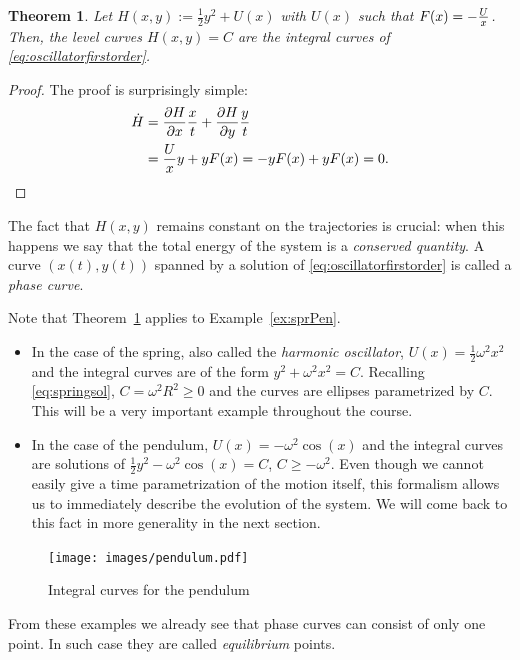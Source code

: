 \documentclass[english,fontsize=11pt,paper=a5,oneside]{scrbook}
\let\d\relax
\DeclareMathOperator{\d}{d}
\newtheorem{theorem}{Theorem}[chapter]
\theoremstyle{definition}
\newenvironment{example}
  {\pushQED{\qed}\renewcommand{\qedsymbol}{$\lozenge$}\examplex}
  {\popQED\endexamplex}
\begin{document}
\begin{theorem}\label{thm:ham1}
    Let $H(x, y) := \frac12 y^2 + U(x)$ with $U(x)$ such that $F(x) = -\frac{\d U}{\d x}$.
    Then, the level curves $H(x,y) = C$ are the integral curves of \eqref{eq:oscillatorfirstorder}.
\end{theorem}
\begin{proof}
The proof is surprisingly simple:
\begin{align*}
    \dot H &= \frac{\partial H}{\partial x}\frac{\d x}{\d t} + \frac{\partial H}{\partial y}\frac{\d y}{\d t} \\
    & = \frac{\d U}{\d x} y + y F(x)
    = -y F(x) + y F(x) = 0.
\end{align*}
\end{proof}

The fact that $H(x,y)$ remains constant on the trajectories is crucial: when this happens we say that the total energy of the system is a \emph{conserved quantity}.
A curve $(x(t), y(t))$ spanned by a solution of \eqref{eq:oscillatorfirstorder} is called a \emph{phase curve}.

\begin{example}
Note that Theorem~\ref{thm:ham1} applies to Example~\ref{ex:sprPen}.
\begin{itemize}
    \item In the case of the spring, also called the \emph{harmonic oscillator}, $U(x) = \frac12 \omega^2 x^2$ and the integral curves are of the form $y^2 + \omega^2 x^2 = C$.
    Recalling \eqref{eq:springsol}, $C = \omega^2 R^2 \geq 0$ and the curves are ellipses parametrized by $C$. 
    This will be a very important example throughout the course.
    \item In the case of the pendulum, $U(x) = -\omega^2 \cos(x)$ and the integral curves are solutions of $\frac12 y^2 - \omega^2 \cos(x) = C$, $C \geq -\omega^2$.
    Even though we cannot easily give a time parametrization of the motion itself, this formalism allows us to immediately describe the evolution of the system.
    We will come back to this fact in more generality in the next section.
\end{itemize}
\end{example}

\begin{figure}[ht]
    \centering
    \texttt{[image: images/pendulum.pdf]}
    \caption{Integral curves for the pendulum}
    \label{fig:pendulum}
\end{figure}

From these examples we already see that phase curves can consist of only one point. In such case they are called \emph{equilibrium} points.
\end{document}
